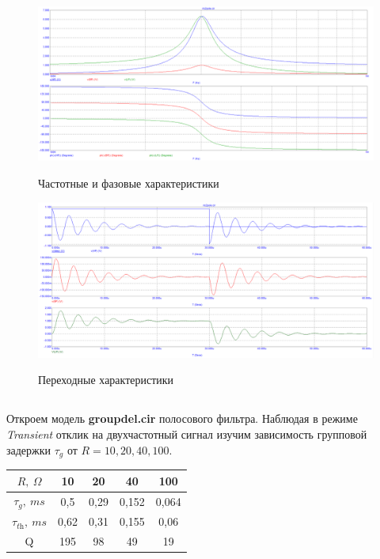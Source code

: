 \documentclass{article}
\begin{document}
\begin{figure}[H]
\centering
\includegraphics[scale=0.4]{rlc2pole_AC1.png}
\label{fig:Image1}
\caption{Частотные и фазовые характеристики}
\end{figure}

\begin{figure}[H]
\centering
\includegraphics[scale=0.4]{rlc2pole_transient.png}
\label{fig:Image1}
\caption{Переходные характеристики}
\end{figure}

\subsection{}
Откроем модель \textbf{groupdel.cir} полосового фильтра. Наблюдая в режиме \textit{Transient} отклик на двухчастотный сигнал изучим зависимость групповой задержки $\tau_g$ от $R = 10, 20, 40, 100$.

\begin{center}
\begin{tabular}{|c|c|c|c|c|}
\hline 
$R, \: \Omega$ & 10 & 20 & 40 & 100 \\ 
\hline 
$\tau_g, \: ms$ & 0,5 & 0,29 & 0,152 & 0,064 \\ 
\hline 
$\tau_{\textit{th}}, \: ms$ & 0,62 & 0,31 & 0,155 & 0,06 \\ 
\hline 
Q & 195 & 98 & 49 & 19 \\ 
\hline 
\end{tabular}
\end{center}
\end{document}
